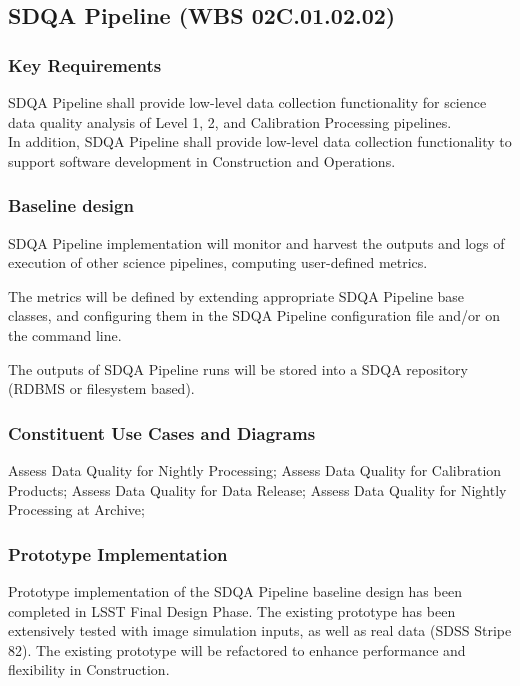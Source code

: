 \documentclass[12pt]{article}
\newcommand{\wbsSDQAP}{WBS 02C.01.02.02}
\begin{document}
\subsection{SDQA Pipeline (\wbsSDQAP)}

\subsubsection{Key Requirements}

SDQA Pipeline shall provide low-level data collection functionality for science data quality analysis of Level 1, 2, and Calibration Processing pipelines.
\\

In addition, SDQA Pipeline shall provide low-level data collection functionality to support software development in Construction and Operations.

\subsubsection{Baseline design}

SDQA Pipeline implementation will monitor and harvest the outputs and logs of execution of other science pipelines, computing user-defined metrics.

The metrics will be defined by extending appropriate SDQA Pipeline base classes, and configuring them in the SDQA Pipeline configuration file and/or on the command line.

The outputs of SDQA Pipeline runs will be stored into a SDQA repository (RDBMS or filesystem based).

\subsubsection{Constituent Use Cases and Diagrams}

Assess Data Quality for Nightly Processing; Assess Data Quality for Calibration Products; Assess Data Quality for Data Release;
Assess Data Quality for Nightly Processing at Archive;

\subsubsection{Prototype Implementation}

Prototype implementation of the SDQA Pipeline baseline design has been completed in LSST Final Design Phase. The existing prototype has been extensively tested with image simulation inputs, as well as real data (SDSS Stripe 82). The existing prototype will be refactored to enhance performance and flexibility in Construction.
\\
\end{document}
